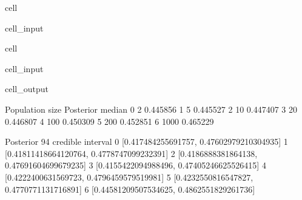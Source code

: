 \documentclass[letterpaper,10pt,english]{jupyterBook}
\begin{document}
\begin{sphinxuseclass}{cell}\begin{sphinxVerbatimInput}

\begin{sphinxuseclass}{cell_input}
\begin{sphinxVerbatim}[commandchars=\\\{\}]
   
\end{sphinxVerbatim}

\end{sphinxuseclass}\end{sphinxVerbatimInput}

\end{sphinxuseclass}
\begin{sphinxuseclass}{cell}\begin{sphinxVerbatimInput}

\begin{sphinxuseclass}{cell_input}
\begin{sphinxVerbatim}[commandchars=\\\{\}]
\end{sphinxVerbatim}

\end{sphinxuseclass}\end{sphinxVerbatimInput}
\begin{sphinxVerbatimOutput}

\begin{sphinxuseclass}{cell_output}
\begin{sphinxVerbatim}[commandchars=\\\{\}]
   Population size  Posterior median  \PYGZbs{}
0                2          0.445856   
1                5          0.445527   
2               10          0.447407   
3               20          0.446807   
4              100          0.450309   
5              200          0.452851   
6             1000          0.465229   

             Posterior 94\PYGZpc{} credible interval  
0   [0.417484255691757, 0.47602979210304935]  
1  [0.41811418664120764, 0.4778747099232391]  
2  [0.4186888381864138, 0.47691604699679235]  
3  [0.4155422094988496, 0.47405246625526415]  
4   [0.4222400631569723, 0.4796459579519981]  
5   [0.4232550816547827, 0.4770771131716891]  
6  [0.44581209507534625, 0.4862551829261736]  
\end{sphinxVerbatim}

\end{sphinxuseclass}\end{sphinxVerbatimOutput}

\end{sphinxuseclass}
\end{document}
